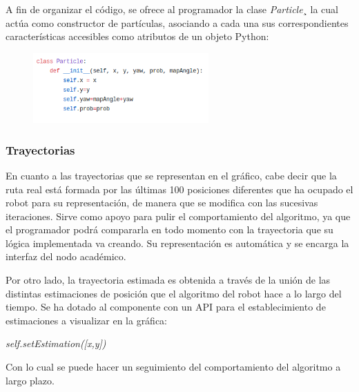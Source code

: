 A fin de organizar el código, se ofrece al programador la clase \textit{Particle}¸ la cual actúa como constructor de partículas, asociando a cada una sus correspondientes características accesibles como atributos de un objeto Python:

\begin{figure}[H]
	\begin{center}
		\includegraphics[width=0.6\textwidth]{figures/claseparticle.png}
		\label{fig.claseparticle}
		\end{center}
\end{figure}

\subsubsection{Trayectorias}
En cuanto a las trayectorias que se representan en el gráfico, cabe decir que la ruta real está formada por las últimas 100 posiciones diferentes que ha ocupado el robot para su representación, de manera que se modifica con las sucesivas iteraciones. Sirve como apoyo para pulir el comportamiento del algoritmo, ya que el programador podrá compararla en todo momento con la trayectoria que su lógica implementada va creando. Su representación es automática y se encarga la interfaz del nodo académico.

Por otro lado, la trayectoria estimada es obtenida a través de la unión de las distintas estimaciones de posición que el algoritmo del robot hace a lo largo del tiempo. Se ha dotado al componente con un API para el establecimiento de estimaciones a visualizar en la gráfica:

\hspace{0.32\linewidth} \textit{self.setEstimation([x,y])}

Con lo cual se puede hacer un seguimiento del comportamiento del algoritmo a largo plazo.
 
